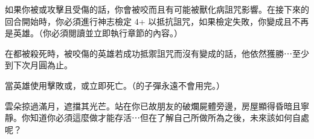 如果你被或攻擊且受傷的話，你會被咬而且有可能被獸化病詛咒影響。在接下來的回合開始時，你必須進行神志檢定 4+ 以抵抗詛咒，如果檢定失敗，你變成且不再是英雄。（你必須閱讀並立即執行章節的內容。）

在都被殺死時，被咬傷的英雄若成功抵禦詛咒而沒有變成的話，他依然獲勝⋯至少到下次月圓為止。

當英雄使用擊敗或，或立即死亡。（的子彈永遠不會用完。）

\begin{HauntStory}
  雲朵掠過滿月，遮擋其光芒。站在你已故朋友的破爛屍體旁邊，房屋顯得昏暗且寧靜。你知道你必須這麼做才能存活⋯但在了解自己所做所為之後，未來該如何自處呢？
\end{HauntStory}
